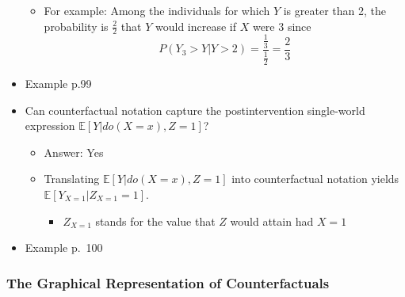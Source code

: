 \documentclass[]{article}
\providecommand{\tightlist}{%
  \setlength{\itemsep}{0pt}\setlength{\parskip}{0pt}}
\begin{document}
\begin{itemize}
  \begin{itemize}
  \tightlist
  \item
    For example: Among the individuals for which \(Y\) is greater than
    2, the probability is \(\frac{2}{2}\) that \(Y\) would increase if
    \(X\) were 3 since
    \[P(Y_3 > Y | Y > 2) = \frac{\frac{1}{3}}{\frac{1}{2}} = \frac{2}{3}\]
  \end{itemize}
\item
  Example p.99
\item
  Can counterfactual notation capture the postintervention single-world
  expression \(\mathbb{E}[Y|do(X = x), Z = 1]\)?

  \begin{itemize}
  \tightlist
  \item
    Answer: Yes
  \item
    Translating \(\mathbb{E}[Y|do(X = x), Z = 1]\) into counterfactual
    notation yields \(\mathbb{E}[Y_{X=1}|Z_{X=1} = 1]\).

    \begin{itemize}
    \tightlist
    \item
      \(Z_{X=1}\) stands for the value that \(Z\) would attain had
      \(X = 1\)
    \end{itemize}
  \end{itemize}
\item
  Example p.~100
\end{itemize}

\subsubsection{The Graphical Representation of
Counterfactuals}\label{the-graphical-representation-of-counterfactuals}
\end{document}
